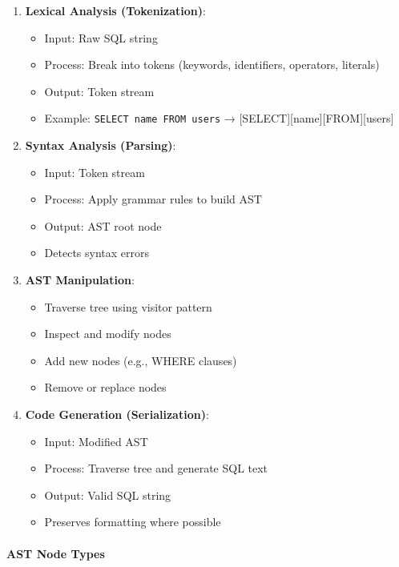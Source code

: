 \begin{enumerate}
    \item \textbf{Lexical Analysis (Tokenization)}:
    \begin{itemize}
        \item Input: Raw SQL string
        \item Process: Break into tokens (keywords, identifiers, operators, literals)
        \item Output: Token stream
        \item Example: \texttt{SELECT name FROM users} → [SELECT][name][FROM][users]
    \end{itemize}
    
    \item \textbf{Syntax Analysis (Parsing)}:
    \begin{itemize}
        \item Input: Token stream
        \item Process: Apply grammar rules to build AST
        \item Output: AST root node
        \item Detects syntax errors
    \end{itemize}
    
    \item \textbf{AST Manipulation}:
    \begin{itemize}
        \item Traverse tree using visitor pattern
        \item Inspect and modify nodes
        \item Add new nodes (e.g., WHERE clauses)
        \item Remove or replace nodes
    \end{itemize}
    
    \item \textbf{Code Generation (Serialization)}:
    \begin{itemize}
        \item Input: Modified AST
        \item Process: Traverse tree and generate SQL text
        \item Output: Valid SQL string
        \item Preserves formatting where possible
    \end{itemize}
\end{enumerate}

\paragraph{AST Node Types}

